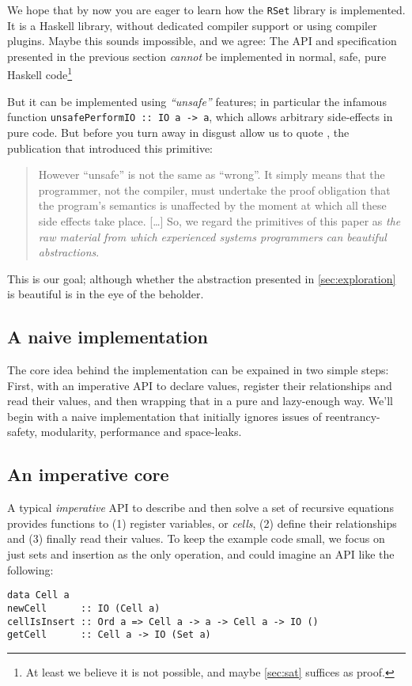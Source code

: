 \documentclass[manuscript,screen,acmsmall]{acmart}
\begin{document}
We hope that by now you are eager to learn how the \verb|RSet| library is implemented. It is a Haskell library, without dedicated compiler support or using compiler plugins. Maybe this sounds impossible, and we agree: The API and specification presented in the previous section \emph{cannot} be implemented in normal, safe, pure Haskell code\footnote{At least we believe it is not possible, and maybe \cref{sec:sat} suffices as proof.}

But it can be implemented using \emph{“unsafe”} features; in particular the infamous function \verb|unsafePerformIO :: IO a -> a|, which allows arbitrary side-effects in pure code. But before you turn away in disgust allow us to quote \citet{unsafePerformIO}, the publication that introduced this primitive:
\begin{quote}
However “unsafe” is not the same as “wrong”. It simply means that the programmer, not the compiler, must undertake the proof obligation that the program's semantics is unaffected by the moment at which all these side effects take place. [\ldots]
So, we regard the primitives of this paper as \emph{the raw material from which experienced systems programmers can beautiful abstractions}.
\end{quote}
This is our goal; although whether the abstraction presented in \cref{sec:exploration} is beautiful is in the eye of the beholder.

\subsection{A naive implementation}

The core idea behind the implementation can be expained in two simple steps: First, with an imperative API to declare values, register their relationships and read their values, and then wrapping that in a pure and lazy-enough way. We’ll begin with a naive implementation that initially ignores issues of reentrancy-safety, modularity, performance and space-leaks.

\subsection{An imperative core}\label{sec:impcore}

A typical \emph{imperative} API to describe and then solve a set of recursive equations provides functions to (1) register variables, or \emph{cells}, (2) define their relationships and (3) finally read their values. To keep the example code small, we focus on just sets and insertion as the only operation, and could imagine an API like the following:
\begin{verbatim}
data Cell a
newCell      :: IO (Cell a)
cellIsInsert :: Ord a => Cell a -> a -> Cell a -> IO ()
getCell      :: Cell a -> IO (Set a)
\end{verbatim}
\end{document}
